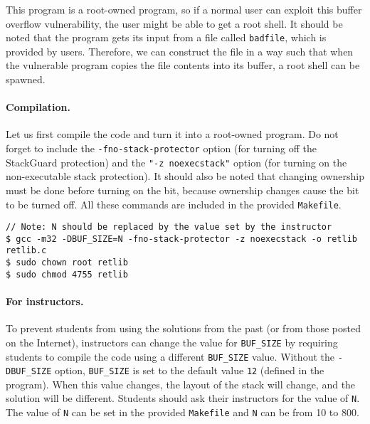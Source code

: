 This program is a root-owned \setuid program, so if a normal user can exploit this buffer
overflow vulnerability, the user might be able to get a root
shell.  It should be noted that the program gets its input from a file
called \texttt{badfile}, which is provided by users. Therefore, we can
construct the file in a way such that when
the vulnerable program copies the file contents into its buffer, a root
shell can be spawned.

\vspace{0.1in}
\paragraph{Compilation.} 
Let us first compile the code and turn it into a root-owned \setuid
program. Do not forget to include the 
\texttt{-fno-stack-protector} option (for turning off the StackGuard
protection) and the \texttt{"-z noexecstack"} option (for turning on
the non-executable stack protection). 
It should also be noted that changing ownership must be done before
turning on the \setuid bit, 
because ownership changes cause the \setuid bit to be turned off.
All these commands are included in the provided \texttt{Makefile}. 


\begin{lstlisting}
// Note: N should be replaced by the value set by the instructor
$ gcc -m32 -DBUF_SIZE=N -fno-stack-protector -z noexecstack -o retlib retlib.c
$ sudo chown root retlib           
$ sudo chmod 4755 retlib           
\end{lstlisting}


\paragraph{For instructors.}
To prevent students from using the solutions from the past (or from those
posted on the Internet), instructors can change the
value for \texttt{BUF\_SIZE} by requiring students to compile the
code using a different \texttt{BUF\_SIZE} value.
Without the \texttt{-DBUF\_SIZE}
option, \texttt{BUF\_SIZE} is set to the default value \texttt{12} (defined
in the program).
When this value changes, the layout of the stack
will change, and the solution will be different.
Students should ask their instructors for
the value of \texttt{N}. The value of \texttt{N} can be set 
in the provided \texttt{Makefile} and \texttt{N} can be 
from 10 to 800.



